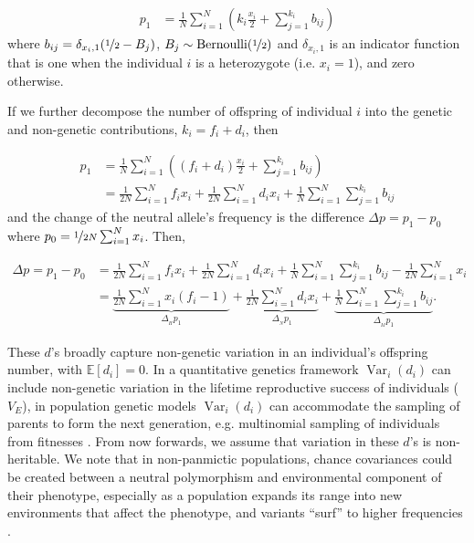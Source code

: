 \documentclass[11pt]{article}
\newcommand{\E}{\mathbb{E}}
\DeclareMathOperator{\var}{Var}
\begin{document}
\begin{align}
  p_1 &= \frac{1}{N} \sum_{i=1}^N \left(k_i \frac{x_i}{2} + \sum_{j=1}^{k_i} b_{ij} \right)
\end{align}
%
where $b_{ij} = \delta_{x_i, 1} (\nicefrac{1}{2} - B_j)$, $B_j \sim
\text{Bernoulli}(\nicefrac{1}{2})$ and $\delta_{x_i, 1}$ is an indicator
function that is one when the individual $i$ is a heterozygote (i.e. $x_i=1$),
and zero otherwise.

If we further decompose the number of offspring of individual $i$ into the
genetic and non-genetic contributions, $k_i = f_i + d_i$, then

\begin{align}
  p_1 &= \frac{1}{N} \sum_{i=1}^N \left( (f_i + d_i) \frac{x_i}{2} + \sum_{j=1}^{k_i} b_{ij} \right) \nonumber \\
      &= \frac{1}{2N} \sum_{i=1}^N f_i x_i + \frac{1}{2N} \sum_{i=1}^N d_i x_i + \frac{1}{N} \sum_{i=1}^N  \sum_{j=1}^{k_i} b_{ij} 
\end{align}
%
and the change of the neutral allele's frequency is the difference $\Delta p = p_1 - p_0$ where $p_0 = \nicefrac{1}{2N} \sum_{i=1}^{N} x_i$. Then,

\begin{align}
\Delta p = p_1 - p_0 &= \frac{1}{2N} \sum_{i=1}^N f_i x_i + \frac{1}{2N} \sum_{i=1}^N d_i x_i + \frac{1}{N} \sum_{i=1}^N  \sum_{j=1}^{k_i} b_{ij} - \frac{1}{2N} \sum_{i=1}^N x_i \nonumber \\
                     &= \underbrace{\frac{1}{2N}\sum_{i=1}^N x_i (f_i - 1)}_{\Delta_{_H} p_1} + \underbrace{\frac{1}{2N} \sum_{i=1}^N d_i x_i}_{\Delta_{_N} p_1} + \underbrace{\frac{1}{N} \sum_{i=1}^N \sum_{j=1}^{k_i} b_{ij}}_{\Delta_{_M} p_1}.
\end{align}
%

These $d$'s broadly capture non-genetic variation in an individual's offspring
number, with $\E[d_i]=0$. In a quantitative genetics framework $\var_i(d_i)$
can include non-genetic variation in the lifetime reproductive success of
individuals ($V_E$), in population genetic models $\var_i(d_i)$ can accommodate
the sampling of parents to form the next generation, e.g. multinomial sampling
of individuals from fitnesses \parencite{Santiago1995-hx}. From now forwards,
we assume that variation in these $d$'s is non-heritable. We note that in
non-panmictic populations, chance covariances could be created between a
neutral polymorphism and environmental component of their phenotype, especially
as a population expands its range into new environments that affect the
phenotype, and variants ``surf'' to higher frequencies
\parencite{Edmonds2004-xf,Hallatschek2008-mn,Excoffier2008-ep}.
\end{document}
